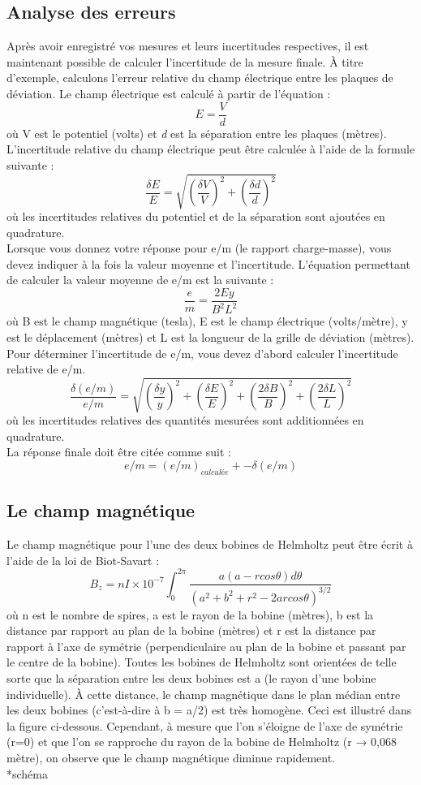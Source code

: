 \documentclass[../main.tex]{subfiles}
\begin{document}
\subsection{Analyse des erreurs}
Après avoir enregistré vos mesures et leurs incertitudes respectives, il est maintenant possible de calculer l'incertitude de la mesure finale.  À titre d'exemple, calculons l'erreur relative du champ électrique entre les plaques de déviation.  Le champ électrique est calculé à partir de l'équation :\\
$$E=\frac{V}{d}$$ 
où V est le potentiel (volts) et \textit{d} est la séparation entre les plaques (mètres).  L'incertitude relative du champ électrique peut être calculée à l'aide de la formule suivante :\\
$$\frac{\delta E}{E} = \sqrt{(\frac{\delta V}{V})^2 + (\frac{\delta d}{d})^2}$$
où les incertitudes relatives du potentiel et de la séparation sont ajoutées en quadrature.\\
Lorsque vous donnez votre réponse pour e/m (le rapport charge-masse), vous devez indiquer à la fois la valeur moyenne et l'incertitude.  L'équation permettant de calculer la valeur moyenne de e/m est la suivante :\\
$$\frac{e}{m} = \frac{2Ey}{B^2L^2}$$
où B est le champ magnétique (tesla), E est le champ électrique (volts/mètre), y est le déplacement (mètres) et L est la longueur de la grille de déviation (mètres).\\
Pour déterminer l'incertitude de e/m, vous devez d'abord calculer l'incertitude relative de e/m.\\
$$\frac{\delta (e/m)}{e/m} = \sqrt{(\frac{\delta y}{y})^2 + (\frac{\delta E}{E})^2 + (\frac{2 \delta B}{B})^2 +(\frac{2 \delta L}{L})^2 }$$
où les incertitudes relatives des quantités mesurées sont additionnées en quadrature.\\
La réponse finale doit être citée comme suit :\\
$$e/m = (e/m)_{calculée} +- \delta(e/m)$$
 \subsection{Le champ magnétique}
Le champ magnétique pour l'une des deux bobines de Helmholtz peut être écrit à l'aide de la loi de Biot-Savart :\\
$$B_z = nI \times 10^{-7}\int_0^{2\pi}\frac{a(a -rcos\theta) d\theta}{(a^2 + b^2 + r^2 - 2arcos\theta)^{3/2}}$$ où n est le nombre de spires, a est le rayon de la bobine (mètres), b est la distance par rapport au plan de la bobine (mètres) et r est la distance par rapport à l'axe de symétrie (perpendiculaire au plan de la bobine et passant par le centre de la bobine).  Toutes les bobines de Helmholtz sont orientées de telle sorte que la séparation entre les deux bobines est a (le rayon d'une bobine individuelle).  À cette distance, le champ magnétique dans le plan médian entre les deux bobines (c'est-à-dire à b = a/2) est très homogène.  Ceci est illustré dans la figure ci-dessous.  Cependant, à mesure que l'on s'éloigne de l'axe de symétrie (r=0) et que l'on se rapproche du rayon de la bobine de Helmholtz (r → 0,068 mètre), on observe que le champ magnétique diminue rapidement. \\
*schéma\\
\end{document}
